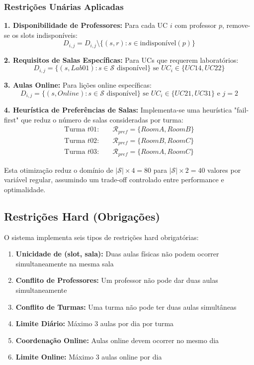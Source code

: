 \documentclass[a4paper, 12pt]{article}
\begin{document}
\subsubsection{Restrições Unárias Aplicadas}

\textbf{1. Disponibilidade de Professores:}
Para cada UC $i$ com professor $p$, remove-se os slots indisponíveis:
$$D_{i,j} = D_{i,j} \setminus \{(s, r) : s \in \text{indisponível}(p)\}$$

\textbf{2. Requisitos de Salas Específicas:}
Para UCs que requerem laboratórios:
$$D_{i,j} = \{(s, Lab01) : s \in \mathcal{S} \text{ disponível}\} \text{ se } UC_i \in \{UC14, UC22\}$$

\textbf{3. Aulas Online:}
Para lições online específicas:
$$D_{i,j} = \{(s, Online) : s \in \mathcal{S} \text{ disponível}\} \text{ se } UC_i \in \{UC21, UC31\} \text{ e } j = 2$$

\textbf{4. Heurística de Preferências de Salas:}
Implementa-se uma heurística "fail-first" que reduz o número de salas consideradas por turma:
\begin{align}
\text{Turma } t01: &\quad \mathcal{R}_{pref} = \{RoomA, RoomB\} \\
\text{Turma } t02: &\quad \mathcal{R}_{pref} = \{RoomB, RoomC\} \\
\text{Turma } t03: &\quad \mathcal{R}_{pref} = \{RoomA, RoomC\}
\end{align}

Esta otimização reduz o domínio de $|\mathcal{S}| \times 4 = 80$ para $|\mathcal{S}| \times 2 = 40$ valores por variável regular, assumindo um trade-off controlado entre performance e optimalidade.

\subsection{Restrições Hard (Obrigações)}

O sistema implementa seis tipos de restrições hard obrigatórias:

\begin{enumerate}
    \item \textbf{Unicidade de (slot, sala):} Duas aulas físicas não podem ocorrer simultaneamente na mesma sala
    \item \textbf{Conflito de Professores:} Um professor não pode dar duas aulas simultaneamente
    \item \textbf{Conflito de Turmas:} Uma turma não pode ter duas aulas simultâneas
    \item \textbf{Limite Diário:} Máximo 3 aulas por dia por turma
    \item \textbf{Coordenação Online:} Aulas online devem ocorrer no mesmo dia
    \item \textbf{Limite Online:} Máximo 3 aulas online por dia
\end{enumerate}
\end{document}

